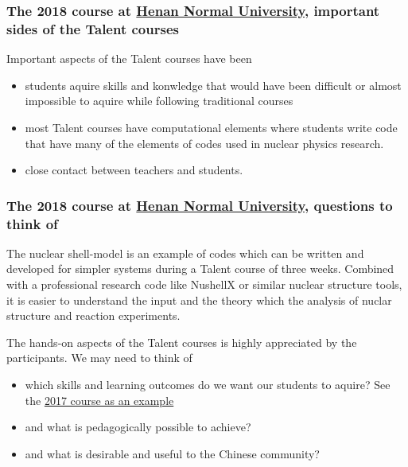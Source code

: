\documentclass{beamer}
\begin{document}
\begin{frame}
\frametitle{The 2018 course at \href{{http://www.htu.cn/english/}}{Henan Normal University}, important sides of the Talent courses}

\begin{block}{}
Important aspects of the Talent courses have been
\begin{itemize}
\item students aquire skills and konwledge that would have been difficult or almost impossible to aquire while following traditional courses

\item most Talent courses have computational elements where students write code that have many of the elements of codes used in nuclear physics research.

\item close contact between teachers and students. 
\end{itemize}

\noindent
\end{block}
\end{frame}

\begin{frame}
\frametitle{The 2018 course at \href{{http://www.htu.cn/english/}}{Henan Normal University}, questions to think of}

\begin{block}{}

The nuclear shell-model is an example of codes which can be written and developed for simpler systems during a Talent course of three weeks. Combined with a professional research code like NushellX or similar nuclear structure tools, it is easier to understand the input and the theory which the analysis of nuclar structure and reaction experiments. 

The hands-on aspects of the Talent courses is highly appreciated by the participants.  We may need to think of
\begin{itemize}
\item which skills and learning outcomes do we want our students to aquire? See the \href{{https://github.com/NuclearTalent/NuclearStructure}}{2017 course as an example}

\item and what is pedagogically possible to achieve?

\item and what is desirable and useful to the Chinese community? 
\end{itemize}

\noindent
\end{block}
\end{frame}
\end{document}
